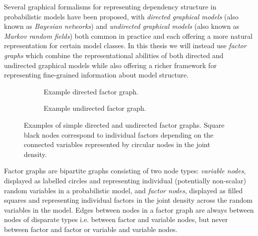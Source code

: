 Several graphical formalisms for representing dependency structure in probabilistic models have been proposed, with \emph{directed graphical models} \citep{pearl1988probabilistic} (also known as \emph{Bayesian networks}) and \emph{undirected graphical models} \citep{kindermann1980markov} (also known as \emph{Markov random fields}) both common in practice and each offering a more natural representation for certain model classes. In this thesis we will instead use \emph{factor graphs} \citep{frey1997factor,frey2002extending} which combine the representational abilities of both directed and undirected graphical models while also offering a richer framework for representing fine-grained information about model structure.

\begin{figure}[t]
\centering
\begin{subfigure}[b]{.45\linewidth}
\vskip 0pt
\centering
{}
\caption{Example directed factor graph.}
\label{sfig:example-directed-factor-graph}
\end{subfigure}%
 \hspace*{\fill}
\begin{subfigure}[b]{.5\linewidth}
\vskip 0pt
\centering
{}
\caption{Example undirected factor graph.}
\label{sfig:example-undirected-factor-graph}
\end{subfigure}%
\caption[Factor graph examples.]{Examples of simple directed and undirected factor graphs. Square black nodes correspond to individual factors depending on the connected variables represented by circular nodes in the joint density.}
\label{fig:example-factor-graphs}
\end{figure}

Factor graphs are bipartite graphs consisting of two node types: \emph{variable nodes}, displayed as labelled circles and representing individual (potentially non-scalar) random variables in a probabilistic model, and \emph{factor nodes}, displayed as filled squares and representing individual factors in the joint density across the random variables in the model. Edges between nodes in a factor graph are always between nodes of disparate types i.e. between factor and variable nodes, but never between factor and factor or variable and variable nodes.

